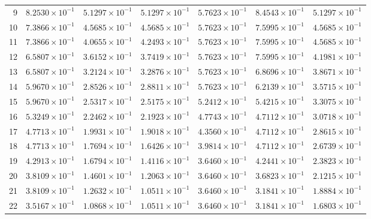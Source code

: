 \begin{table}[H]
\begin{tabular}{@{}rrrrrrr@{}}
9 & $8.2530\times10^{-1}$ & $5.1297\times10^{-1}$ & $5.1297\times10^{-1}$ & $5.7623\times10^{-1}$ & $8.4543\times10^{-1}$ & $5.1297\times10^{-1}$\\
10 & $7.3866\times10^{-1}$ & $4.5685\times10^{-1}$ & $4.5685\times10^{-1}$ & $5.7623\times10^{-1}$ & $7.5995\times10^{-1}$ & $4.5685\times10^{-1}$\\
11 & $7.3866\times10^{-1}$ & $4.0655\times10^{-1}$ & $4.2493\times10^{-1}$ & $5.7623\times10^{-1}$ & $7.5995\times10^{-1}$ & $4.5685\times10^{-1}$\\
12 & $6.5807\times10^{-1}$ & $3.6152\times10^{-1}$ & $3.7419\times10^{-1}$ & $5.7623\times10^{-1}$ & $7.5995\times10^{-1}$ & $4.1981\times10^{-1}$\\
13 & $6.5807\times10^{-1}$ & $3.2124\times10^{-1}$ & $3.2876\times10^{-1}$ & $5.7623\times10^{-1}$ & $6.8696\times10^{-1}$ & $3.8671\times10^{-1}$\\
14 & $5.9670\times10^{-1}$ & $2.8526\times10^{-1}$ & $2.8811\times10^{-1}$ & $5.7623\times10^{-1}$ & $6.2139\times10^{-1}$ & $3.5715\times10^{-1}$\\
15 & $5.9670\times10^{-1}$ & $2.5317\times10^{-1}$ & $2.5175\times10^{-1}$ & $5.2412\times10^{-1}$ & $5.4215\times10^{-1}$ & $3.3075\times10^{-1}$\\
16 & $5.3249\times10^{-1}$ & $2.2462\times10^{-1}$ & $2.1923\times10^{-1}$ & $4.7743\times10^{-1}$ & $4.7112\times10^{-1}$ & $3.0718\times10^{-1}$\\
17 & $4.7713\times10^{-1}$ & $1.9931\times10^{-1}$ & $1.9018\times10^{-1}$ & $4.3560\times10^{-1}$ & $4.7112\times10^{-1}$ & $2.8615\times10^{-1}$\\
18 & $4.7713\times10^{-1}$ & $1.7694\times10^{-1}$ & $1.6426\times10^{-1}$ & $3.9814\times10^{-1}$ & $4.7112\times10^{-1}$ & $2.6739\times10^{-1}$\\
19 & $4.2913\times10^{-1}$ & $1.6794\times10^{-1}$ & $1.4116\times10^{-1}$ & $3.6460\times10^{-1}$ & $4.2441\times10^{-1}$ & $2.3823\times10^{-1}$\\
20 & $3.8109\times10^{-1}$ & $1.4601\times10^{-1}$ & $1.2063\times10^{-1}$ & $3.6460\times10^{-1}$ & $3.6823\times10^{-1}$ & $2.1215\times10^{-1}$\\
21 & $3.8109\times10^{-1}$ & $1.2632\times10^{-1}$ & $1.0511\times10^{-1}$ & $3.6460\times10^{-1}$ & $3.1841\times10^{-1}$ & $1.8884\times10^{-1}$\\
22 & $3.5167\times10^{-1}$ & $1.0868\times10^{-1}$ & $1.0511\times10^{-1}$ & $3.6460\times10^{-1}$ & $3.1841\times10^{-1}$ & $1.6803\times10^{-1}$\\

\end{tabular}
\end{table}
